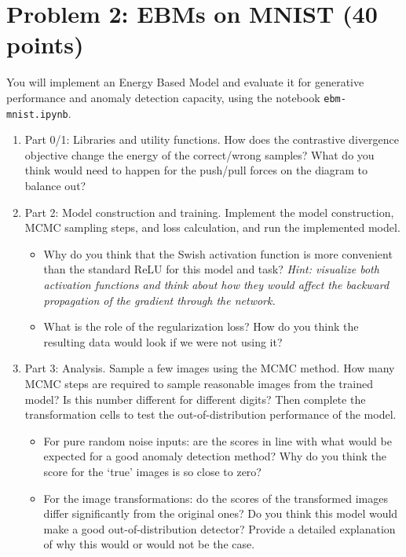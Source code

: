 \section{Problem 2: EBMs on MNIST (40 points)}

\begin{question}
You will implement an Energy Based Model and evaluate it for generative performance and anomaly detection capacity, using the notebook \texttt{ebm-mnist.ipynb}.
\begin{enumerate}
  \item[(a)] Part 0/1: Libraries and utility functions. How does the contrastive divergence objective change the energy of the correct/wrong samples? What do you think would need to happen for the push/pull forces on the diagram to balance out?
  \item[(b)] Part 2: Model construction and training. Implement the model construction, MCMC sampling steps, and loss calculation, and run the implemented model.
  \begin{itemize}
    \item Why do you think that the Swish activation function is more convenient than the standard ReLU for this model and task? \emph{Hint: visualize both activation functions and think about how they would affect the backward propagation of the gradient through the network.}
    \item What is the role of the regularization loss? How do you think the resulting data would look if we were not using it?
  \end{itemize}
  \item[(c)] Part 3: Analysis. Sample a few images using the MCMC method. How many MCMC steps are required to sample reasonable images from the trained model? Is this number different for different digits? Then complete the transformation cells to test the out-of-distribution performance of the model.
  \begin{itemize}
    \item For pure random noise inputs: are the scores in line with what would be expected for a good anomaly detection method? Why do you think the score for the `true' images is so close to zero?
    \item For the image transformations: do the scores of the transformed images differ significantly from the original ones? Do you think this model would make a good out-of-distribution detector? Provide a detailed explanation of why this would or would not be the case.
  \end{itemize}
\end{enumerate}
\end{question}

